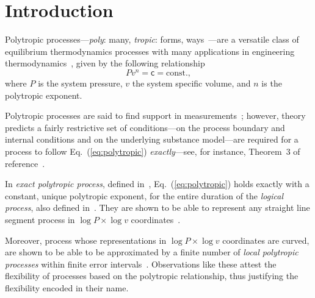 \section{Introduction}

    Polytropic        processes---\emph{poly}:        many,        \emph{tropic}:         forms,
    ways~\cite{2020-NaaktgeborenC-engrXiv}---are a versatile class of equilibrium thermodynamics
    processes          with          many          applications          in          engineering
    thermodynamics~\cite{2002-MoranMJ+ShapiroHN-LTC,                 2013-CengelYA+BolesMA-AMGH,
    2015-KroosKA+PotterMC-Cengage,  1986-JonesJB+HawkinsGA-Wiley},  given   by   the   following
    relationship
    \begin{equation}
        Pv^n = \mathsf{c} = \mbox{const.},
        \label{eq:polytropic}
    \end{equation}
    \noindent where $P$ is the system pressure, $v$ the system specific volume, and $n$  is  the
    polytropic exponent.

    Polytropic       processes       are       said       to       find        support        in
    measurements~\cite{2013-CengelYA+BolesMA-AMGH,                   2002-MoranMJ+ShapiroHN-LTC,
    1985-WylenG-Wiley};         however,          theory~\cite{2012-ChristiansJ-IntJMechEngEduc,
    2020-NaaktgeborenC-engrXiv} predicts a fairly restrictive set of conditions---on the process
    boundary and internal conditions and on the underlying substance model---are required for  a
    process to follow Eq.~(\ref{eq:polytropic}) \emph{exactly}---see, for instance, Theorem~3 of
    reference~\cite{2020-NaaktgeborenC-engrXiv}.

    In   \emph{exact   polytropic   process},   defined    in~\cite{2020-NaaktgeborenC-engrXiv},
    Eq.~(\ref{eq:polytropic}) holds exactly with a constant, unique polytropic exponent, for the
    entire     duration     of      the      \emph{logical      process},      also      defined
    in~\cite{2020-NaaktgeborenC-engrXiv}. They are shown to be able to  represent  any  straight
    line      segment      process       in       $\log       P       \times       \log       v$
    coordinates~\cite{2020-NaaktgeborenC-engrXiv}.

    Moreover, process whose representations in $\log P \times \log v$  coordinates  are  curved,
    are shown to be able to be  approximated  by  a  finite  number  of  \emph{local  polytropic
    processes} within  finite  error  intervals~\cite{2020-NaaktgeborenC-engrXiv}.  Observations
    like these attest the flexibility of processes based on the  polytropic  relationship,  thus
    justifying the flexibility encoded in their name.

